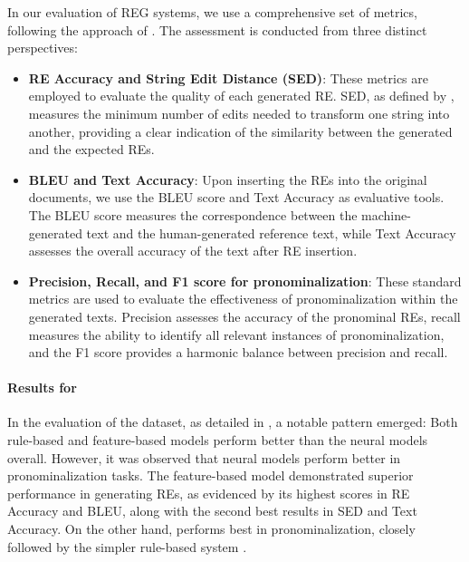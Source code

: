 In our evaluation of REG systems, we use a comprehensive set of metrics, following the approach of \citet{cunha-etal-2020-referring}. The assessment is conducted from three distinct perspectives:

\begin{itemize}
	\item\textbf{RE Accuracy and String Edit Distance (SED)}: These metrics are employed to evaluate the quality of each generated RE. SED, as defined by \citet{Levenshtein_SPD66}, measures the minimum number of edits needed to transform one string into another, providing a clear indication of the similarity between the generated and the expected REs.
	\item\textbf{BLEU and Text Accuracy}: Upon inserting the REs into the original documents, we use the BLEU score \citep{papineni2002bleu} and Text Accuracy as evaluative tools. The BLEU score measures the correspondence between the machine-generated text and the human-generated reference text, while Text Accuracy assesses the overall accuracy of the text after RE insertion.
	\item\textbf{ Precision, Recall, and F1 score for pronominalization}: These standard metrics are used to evaluate the effectiveness of pronominalization within the generated texts. Precision assesses the accuracy of the pronominal REs, recall measures the ability to identify all relevant instances of pronominalization, and the F1 score provides a harmonic balance between precision and recall.
\end{itemize}


\paragraph*{Results for \webnlg}

In the evaluation of the \webnlg dataset, as detailed in , a notable pattern emerged: Both rule-based and feature-based models perform better than the neural models overall. However, it was observed that neural models perform better in pronominalization tasks. The feature-based model  demonstrated superior performance in generating REs, as evidenced by its highest scores in RE Accuracy and BLEU, along with the second best results in SED and Text Accuracy. On the other hand,  performs best in pronominalization, closely followed by the simpler rule-based system .




